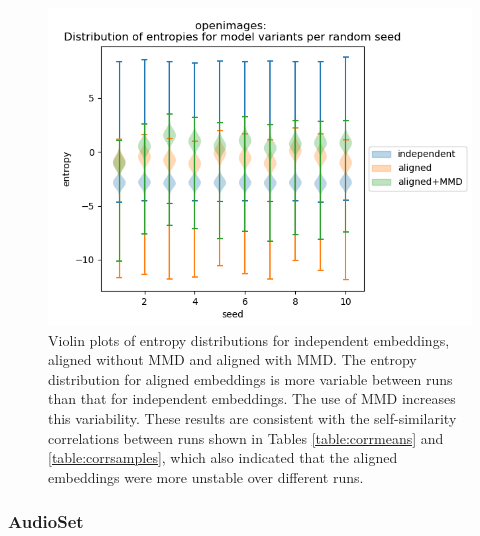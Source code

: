\begin{figure}[H]
\label{fig:entropyviolinimgs}
\centering
\includegraphics[width=\textwidth]{images/results/openimages_entropies_violin.png}
\caption{Violin plots of entropy distributions for independent embeddings, aligned without MMD and aligned with MMD. The entropy distribution for aligned embeddings is more variable between runs than that for independent embeddings. The use of MMD increases this variability. These results are consistent with the self-similarity correlations between runs shown in Tables \ref{table:corrmeans} and \ref{table:corrsamples}, which also indicated that the aligned embeddings were more unstable over different runs.}
\end{figure}

\subsubsection{AudioSet}


